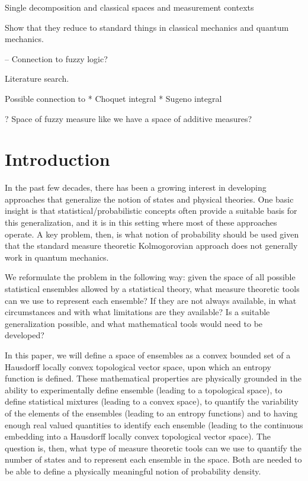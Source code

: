 \documentclass[10pt,twocolumn, nofootinbib]{revtex4-2}
\begin{document}
Single decomposition and classical spaces and measurement contexts

Show that they reduce to standard things in classical mechanics and quantum mechanics.

-- Connection to fuzzy logic?

Literature search.

Possible connection to
* Choquet integral
* Sugeno integral

? Space of fuzzy measure like we have a space of additive measures?


\section{Introduction}

In the past few decades, there has been a growing interest in developing approaches that generalize the notion of states and physical theories. One basic insight is that statistical/probabilistic concepts often provide a suitable basis for this generalization, and it is in this setting where most of these approaches operate. A key problem, then, is what notion of probability should be used given that the standard measure theoretic Kolmogorovian approach does not generally work in quantum mechanics.

We reformulate the problem in the following way: given the space of all possible statistical ensembles allowed by a statistical theory, what measure theoretic tools can we use to represent each ensemble? If they are not always available, in what circumstances and with what limitations are they available? Is a suitable generalization possible, and what mathematical tools would need to be developed?

In this paper, we will define a space of ensembles as a convex bounded set of a Hausdorff locally convex topological vector space, upon which an entropy function is defined. These mathematical properties are physically grounded in the ability to experimentally define ensemble (leading to a topological space), to define statistical mixtures (leading to a convex space), to quantify the variability of the elements of the ensembles (leading to an entropy functions) and to having enough real valued quantities to identify each ensemble (leading to the continuous embedding into a Hausdorff locally convex topological vector space). The question is, then, what type of measure theoretic tools can we use to quantify the number of states and to represent each ensemble in the space. Both are needed to be able to define a physically meaningful notion of probability density.
\end{document}

